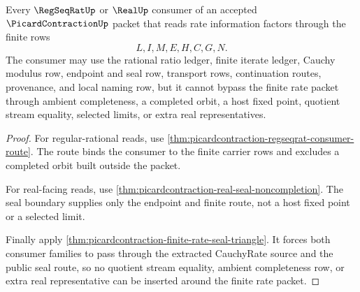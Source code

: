 \begin{theorem}
\label{thm:picardcontraction-regseqrat-real-rate-nonescape}
Every $\RegSeqRatUp$ or $\RealUp$ consumer of an accepted $\PicardContractionUp$ packet that reads rate information factors through the finite rows
$$
L,I,M,E,H,C,G,N.
$$
The consumer may use the rational ratio ledger, finite iterate ledger, Cauchy modulus row, endpoint and seal row, transport rows, continuation routes, provenance, and local naming row, but it cannot bypass the finite rate packet through ambient completeness, a completed orbit, a host fixed point, quotient stream equality, selected limits, or extra real representatives.
\end{theorem}
\begin{proof}
For regular-rational reads, use \autoref{thm:picardcontraction-regseqrat-consumer-route}. The route binds the consumer to the finite carrier rows and excludes a completed orbit built outside the packet.

For real-facing reads, use \autoref{thm:picardcontraction-real-seal-noncompletion}. The seal boundary supplies only the endpoint and finite route, not a host fixed point or a selected limit.

Finally apply \autoref{thm:picardcontraction-finite-rate-seal-triangle}. It forces both consumer families to pass through the extracted CauchyRate source and the public seal route, so no quotient stream equality, ambient completeness row, or extra real representative can be inserted around the finite rate packet.
\end{proof}

